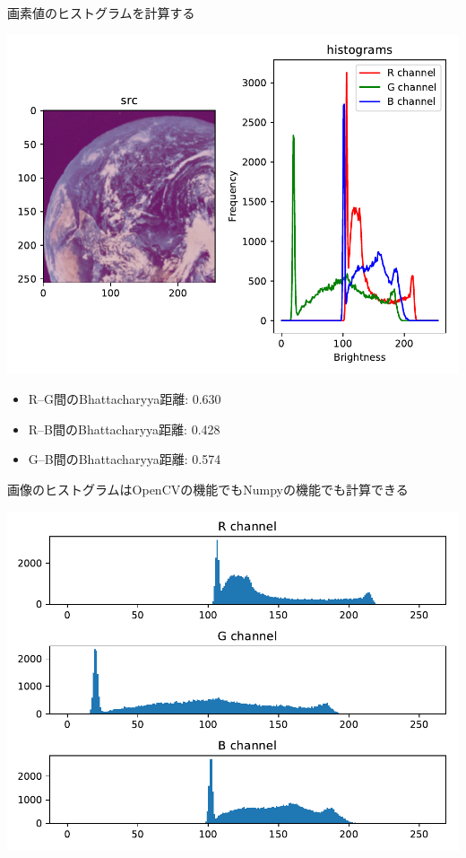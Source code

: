 \documentclass[10pt]{beamer}
\begin{document}
	\begin{frame}{画素値のヒストグラムを計算する}
	    \begin{center}
	        \includegraphics[width=0.7\hsize]{figs/compute_hist.pdf}
	    \end{center}
	    \begin{itemize}
	        \item R--G間のBhattacharyya距離: 0.630
	        \item R--B間のBhattacharyya距離: 0.428
	        \item G--B間のBhattacharyya距離: 0.574
	    \end{itemize}
	\end{frame}
	
	\begin{frame}{画像のヒストグラムはOpenCVの機能でもNumpyの機能でも計算できる}
	    \begin{center}
	        \includegraphics[width=0.8\hsize]{figs/compute_hist_numpy.pdf}
	    \end{center}
	\end{frame}
	
\end{document}
